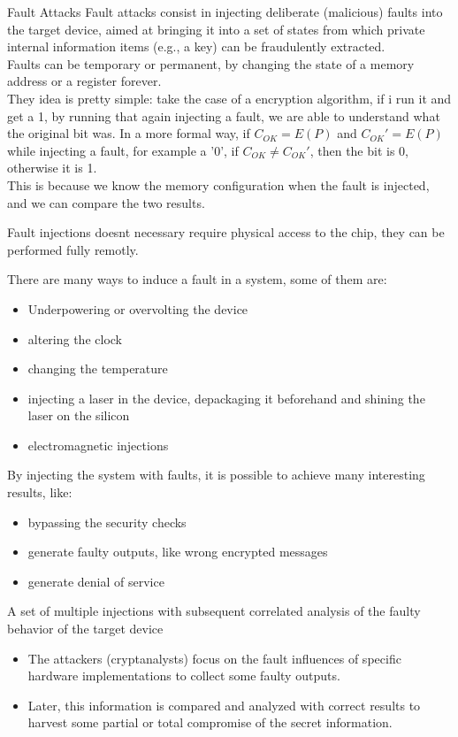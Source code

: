 \begin{chapter}{Fault Attacks}
  Fault attacks consist in injecting deliberate (malicious) faults into the target device, aimed at
  bringing it into a set of states from which private internal information items (e.g., a key) can
  be fraudulently extracted.\\
  Faults can be temporary or permanent, by changing the state of a memory address or a register forever.\\
  They idea is pretty simple: take the case of a encryption algorithm, if i run it and get a 1, by
  running that again injecting a fault, we are able to understand what the original bit was. In a
  more formal way, if $C_{OK}=E(P)$ and $C_{OK}'=E(P)$ while injecting a fault, for example a '0',
  if $C_{OK} \neq C_{OK}'$, then the bit is 0, otherwise it is 1.\\
  This is because we know the memory configuration when the fault is injected, and we can compare 
  the two results.\\

  \begin{boxH}
    Fault injections doesnt necessary require physical access to the chip, they can be performed
    fully remotly.
  \end{boxH}

  There are many ways to induce a fault in a system, some of them are:
  \begin{itemize}
    \item Underpowering or overvolting the device
    \item altering the clock
    \item changing the temperature
    \item injecting a laser in the device, depackaging it beforehand and shining the laser on the
      silicon
    \item electromagnetic injections
  \end{itemize}

  By injecting the system with faults, it is possible to achieve many interesting results, like:
  \begin{itemize}
    \item bypassing the security checks
    \item generate faulty outputs, like wrong encrypted messages
    \item generate denial of service
  \end{itemize}

  A set of multiple injections with subsequent correlated analysis of the faulty behavior of the
  target device
  \begin{itemize}
    \item The attackers (cryptanalysts) focus on the fault influences of specific hardware
      implementations to collect some faulty outputs.
    \item Later, this information is compared and analyzed with correct results to harvest some
      partial or total compromise of the secret information.
  \end{itemize}


\end{chapter}
